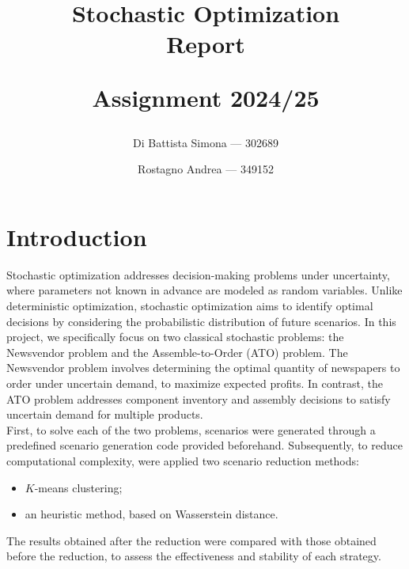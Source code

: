 \documentclass[a4paper,12pt]{article}
\begin{document}
	
	\title{\textbf{Stochastic Optimization}\\
		\vspace{0.5em}\huge\textbf{Report}
		\author{
			Di Battista Simona — 302689%
			\and
			Rostagno Andrea — 349152\\
		}
		
		\vspace{0.5cm}
		\large Assignment 2024/25}
	\maketitle
	\thispagestyle{empty}   %
	\newpage                %
	
	
	\tableofcontents
	\newpage                %
	
	
	\section{Introduction}
	Stochastic optimization addresses decision-making problems under uncertainty, where parameters not known in advance are modeled as random variables. Unlike deterministic optimization, stochastic optimization aims to identify optimal decisions by considering the probabilistic distribution of future scenarios. In this project, we specifically focus on two classical stochastic problems: the Newsvendor problem and the Assemble-to-Order (ATO) problem. The Newsvendor problem involves determining the optimal quantity of newspapers to order under uncertain demand, to maximize expected profits. In contrast, the ATO problem addresses component inventory and assembly decisions to satisfy uncertain demand for multiple products.\\
	
	First, to solve each of the two problems, scenarios were generated through a predefined scenario generation code provided beforehand. Subsequently, to reduce computational complexity, were applied two scenario reduction methods: 
	\begin{itemize}
		\item $K$-means clustering; 
		\item an heuristic method, based on Wasserstein distance.
	\end{itemize}
	The results obtained after the reduction were compared with those obtained before the reduction, to assess the effectiveness and stability of each strategy.
	
\end{document}
